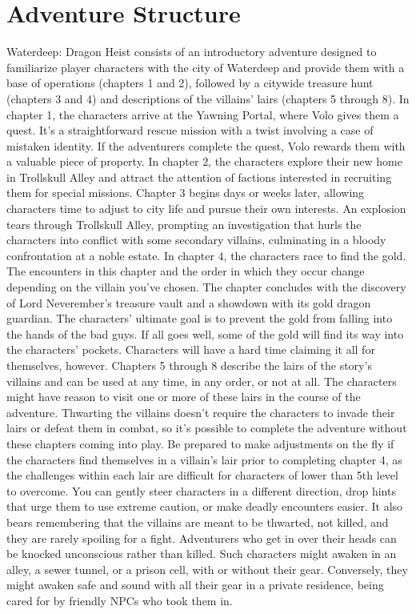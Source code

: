 \documentclass[10pt,a4paper,twoside,twocolumn,openany,nodeprecatedcode]{dndbook}
\begin{document}
\section{Adventure Structure}
Waterdeep: Dragon Heist consists of an introductory adventure designed to familiarize player characters with the city of Waterdeep and provide them with a base of operations (chapters 1 and 2), followed by a citywide treasure hunt (chapters 3 and 4) and descriptions of the villains' lairs (chapters 5 through 8).
In chapter 1, the characters arrive at the Yawning Portal, where Volo gives them a quest. It's a straightforward rescue mission with a twist involving a case of mistaken identity. If the adventurers complete the quest, Volo rewards them with a valuable piece of property.
In chapter 2, the characters explore their new home in Trollskull Alley and attract the attention of factions interested in recruiting them for special missions.
Chapter 3 begins days or weeks later, allowing characters time to adjust to city life and pursue their own interests. An explosion tears through Trollskull Alley, prompting an investigation that hurls the characters into conflict with some secondary villains, culminating in a bloody confrontation at a noble estate.
In chapter 4, the characters race to find the gold. The encounters in this chapter and the order in which they occur change depending on the villain you've chosen. The chapter concludes with the discovery of Lord Neverember's treasure vault and a showdown with its gold dragon guardian. The characters' ultimate goal is to prevent the gold from falling into the hands of the bad guys. If all goes well, some of the gold will find its way into the characters' pockets. Characters will have a hard time claiming it all for themselves, however.
Chapters 5 through 8 describe the lairs of the story's villains and can be used at any time, in any order, or not at all. The characters might have reason to visit one or more of these lairs in the course of the adventure. Thwarting the villains doesn't require the characters to invade their lairs or defeat them in combat, so it's possible to complete the adventure without these chapters coming into play.
Be prepared to make adjustments on the fly if the characters find themselves in a villain's lair prior to completing chapter 4, as the challenges within each lair are difficult for characters of lower than 5th level to overcome. You can gently steer characters in a different direction, drop hints that urge them to use extreme caution, or make deadly encounters easier. It also bears remembering that the villains are meant to be thwarted, not killed, and they are rarely spoiling for a fight. Adventurers who get in over their heads can be knocked unconscious rather than killed. Such characters might awaken in an alley, a sewer tunnel, or a prison cell, with or without their gear. Conversely, they might awaken safe and sound with all their gear in a private residence, being cared for by friendly NPCs who took them in.
\end{document}
